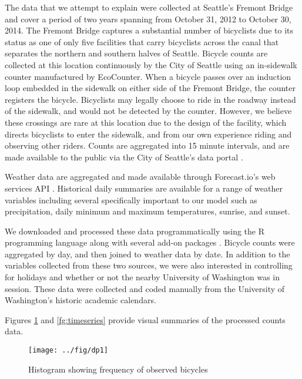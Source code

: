 \documentclass[12pt,letterpaper,article,twocolumn]{memoir}
\begin{document}
The data that we attempt to explain were collected at Seattle's
Fremont Bridge and cover a period of two years spanning from October
31, 2012 to October 30, 2014. The Fremont Bridge captures a
substantial number of bicyclists due to its status as one of only five
facilities that carry bicyclists across the canal that separates the
northern and southern halves of Seattle. Bicycle counts are collected
at this location continuously by the City of Seattle using an
in-sidewalk counter manufactured by EcoCounter. When a bicycle passes
over an induction loop embedded in the sidewalk on either side of the
Fremont Bridge, the counter registers the bicycle. Bicyclists may
legally choose to ride in the roadway instead of the sidewalk, and
would not be detected by the counter. However, we believe these
crossings are rare at this location due to the design of the facility,
which directs bicyclists to enter the sidewalk, and from our own
experience riding and observing other riders. Counts are aggregated
into 15 minute intervals, and are made available to the public via the
City of Seattle's data
portal \parencite{City-of-Seattle:aa,City-of-Seattle:ab}.

Weather data are aggregated and made available through Forecast.io's
web services API \parencite{The-Dark-Sky-Company:aa}. Historical daily
summaries are available for a range of weather variables including
several specifically important to our model such as precipitation,
daily minimum and maximum temperatures, sunrise, and sunset.

We downloaded and processed these data programmatically using the R
programming language along with several add-on
packages \parencite{Grolemund:2011aa,Wickham:2011aa,Couture-Beil:2014aa,Lang:2014aa,R-Core-Team:2014aa}.
Bicycle counts were aggregated by day, and then joined to weather data
by date. In addition to the variables collected from these two
sources, we were also interested in controlling for holidays and
whether or not the nearby University of Washington was in session.
These data were collected and coded manually from the University of
Washington's historic academic calendars.

Figures \ref{fg:hist} and \ref{fg:timeseries} provide visual summaries
of the processed counts data.

\begin{figure}[h!]
  \centering
  \texttt{[image: ../fig/dp1]}
  \caption{Histogram showing frequency of observed bicycles}
  \label{fg:hist}
\end{figure}
\end{document}
